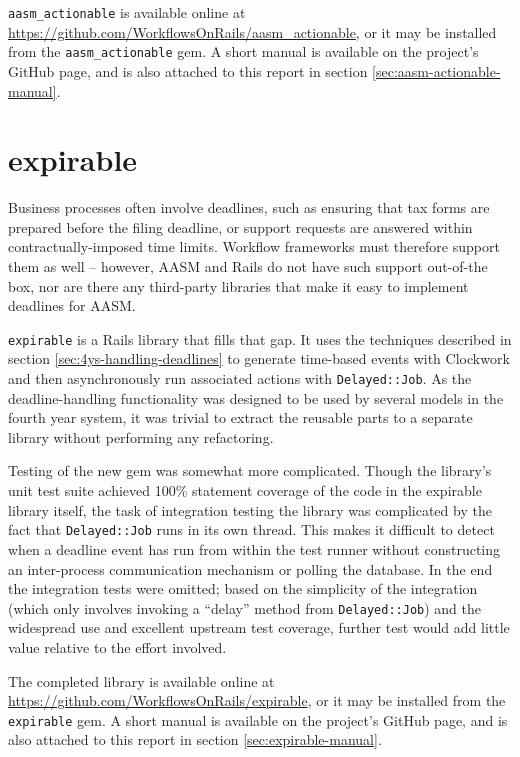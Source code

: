 \documentclass[document.tex]{subfiles}
\begin{document}
\verb!aasm_actionable! is available online at \url{https://github.com/WorkflowsOnRails/aasm_actionable}, or it may be installed from the \verb!aasm_actionable! gem.
A short manual is available on the project's GitHub page, and is also attached to this report in section \ref{sec:aasm-actionable-manual}.

\FloatBarrier


\section {expirable}

Business processes often involve deadlines, such as ensuring that tax forms are prepared before the filing deadline, or support requests are answered within contractually-imposed time limits. Workflow frameworks must therefore support them as well -- however, AASM and Rails do not have such support out-of-the box, nor are there any third-party libraries that make it easy to implement deadlines for AASM.

\verb!expirable! \cite{expirable} is a Rails library that fills that gap. It uses the techniques described in section \ref{sec:4ys-handling-deadlines} to generate time-based events with Clockwork and then asynchronously run associated actions with \verb!Delayed::Job!. As the deadline-handling functionality was designed to be used by several models in the fourth year system, it was trivial to extract the reusable parts to a separate library without performing any refactoring.

Testing of the new gem was somewhat more complicated. Though the library's unit test suite achieved 100\% statement coverage of the code in the expirable library itself, the task of integration testing the library was complicated by the fact that \verb!Delayed::Job! runs in its own thread. This makes it difficult to detect when a deadline event has run from within the test runner without constructing an inter-process communication mechanism or polling the database. In the end the integration tests were omitted; based on the simplicity of the integration (which only involves invoking a ``delay'' method from \verb!Delayed::Job!) and the widespread use and excellent upstream test coverage, further test would add little value relative to the effort involved.

The completed library is available online at \url{https://github.com/WorkflowsOnRails/expirable}, or it may be installed from the \verb!expirable! gem.
A short manual is available on the project's GitHub page, and is also attached to this report in section \ref{sec:expirable-manual}.


\end{document}
